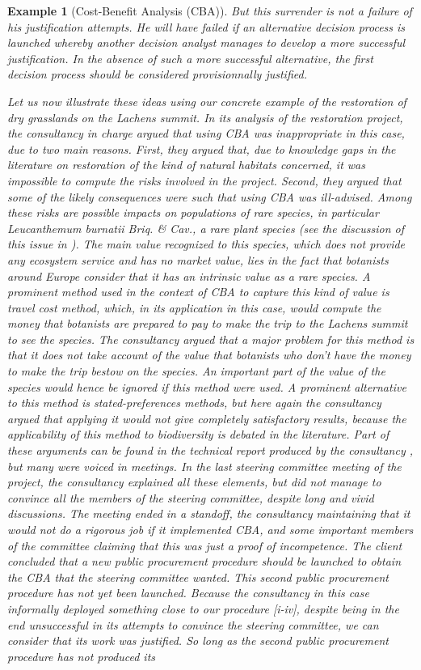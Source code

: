 \documentclass[preprint, french, english, 11pt, authoryear]{elsarticle}%
\newtheorem{example}{Example}
\begin{document}
\begin{example}[Cost-Benefit Analysis (CBA)]
But this surrender is not a failure of his justification attempts. He will have failed if an alternative decision process is launched whereby another decision analyst manages to develop a more successful justification. In the absence of such a more successful alternative, the first decision process should be considered provisionnally justified.

Let us now illustrate these ideas using our concrete example of the restoration of dry grasslands on the Lachens summit. In its analysis of the restoration project, the consultancy in charge argued that using CBA was inappropriate in this case, due to two main reasons. First, they argued that, due to knowledge gaps in the literature on restoration of the kind of natural habitats concerned, it was impossible to compute the risks involved in the project. Second, they argued that some of the likely consequences were such that using CBA was ill-advised. Among these risks are possible impacts on populations of rare species, in particular \emph{Leucanthemum burnatii} Briq. \& Cav., a rare plant species (see the discussion of this issue in \cite{meinard_ethical_2016}). The main value recognized to this species, which does not provide any ecosystem service and has no market value, lies in the fact that botanists around Europe consider that it has an intrinsic value as a rare species. A prominent method used in the context of CBA to capture this kind of value is travel cost method, which, in its application in this case, would compute the money that botanists are prepared to pay to make the trip to the Lachens summit to see the species. The consultancy argued that a major problem for this method is that it does not take account of the value that botanists who don't have the money to make the trip bestow on the species. An important part of the value of the species would hence be ignored if this method were used. A prominent alternative to this method is stated-preferences methods, but here again the consultancy argued that applying it would not give completely satisfactory results, because the applicability of this method to biodiversity is debated in the literature. Part of these arguments can be found in the technical report produced by the consultancy \citep{meinard_etude_2015}, but many were voiced in meetings. In the last steering committee meeting of the project, the consultancy explained all these elements, but did not manage to convince all the members of the steering committee, despite long and vivid discussions. The meeting ended in a standoff, the consultancy maintaining that it would not do a rigorous job if it implemented CBA, and some important members of the committee claiming that this was just a proof of incompetence. The client concluded that a new public procurement procedure should be launched to obtain the CBA that the steering committee wanted. This second public procurement procedure has not yet been launched. Because the consultancy in this case informally deployed something close to our procedure [i-iv], despite being in the end unsuccessful in its attempts to convince the steering committee, we can consider that its work was justified. So long as the second public procurement procedure has not produced its 
\end{example}
\end{document}
